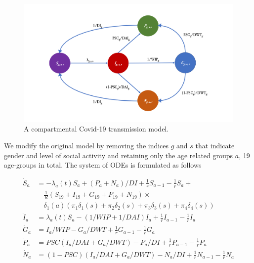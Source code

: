 \documentclass[12pt]{article}
\begin{document}
\begin{figure}[h!]
\centering
\includegraphics[width=1\textwidth]{COVIDb}
\caption{A compartmental Covid-19 transmission model.}
\label{fig:model}
\end{figure}

We modify the original model by removing the indices $g$ and $s$ that indicate gender and level of social activity and retaining only the age related groups $a$, 19 age-groups in total. The system of ODEs is formulated as follows

\begin{align}
\label{eq:ODE}
\dot{S}_{a} & =  -\lambda_{a}(t)S_{a} + (P_{a} + N_{a})/DI + \frac{1}{r}S_{a-1} - \frac{1}{r}S_{a} + \\ \nonumber
& \quad \frac{1}{R}(S_{19} + I_{19} + G_{19} + P_{19} + N_{19}) \times \\ \nonumber
& \quad \delta_1(a)(\pi_1\delta_1(s) + \pi_2\delta_2(s) + \pi_3\delta_3(s) + \pi_4\delta_4(s)) \\ 
\dot{I}_{a}  & =  \lambda_{a}(t)S_{a} - (1/WIP + 1/DAI)I_{a} + \frac{1}{r}I_{a-1}-\frac{1}{r}I_{a} \\ 
\dot{G}_{a}  & =  I_{a}/WIP - G_{a}/DWT + \frac{1}{r}G_{a-1} - \frac{1}{r}G_{a} \\ 
\dot{P}_{a}  & =  PSC(I_{a}/DAI + G_{a}/DWT) - P_{a}/DI + \frac{1}{r}P_{a-1} - \frac{1}{r}P_{a} \\
\dot{N}_{a}  & =  (1-PSC)(I_{a}/DAI + G_{a}/DWT) - N_{a}/DI + \frac{1}{r}N_{a-1}-\frac{1}{r}N_{a} \\ \nonumber
\end{align}
\end{document}

